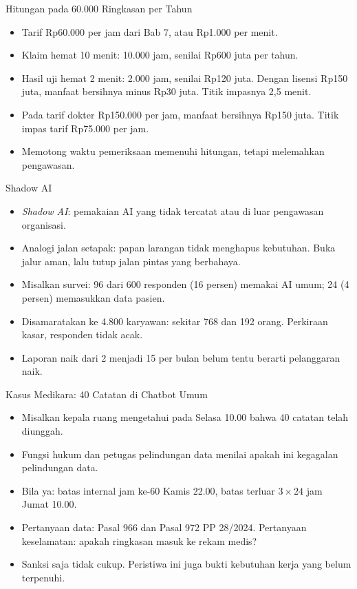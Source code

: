 \documentclass[aspectratio=169, table, 12pt]{beamer}
\begin{document}
\begin{frame}{{\Large Hitungan pada 60.000 Ringkasan per Tahun}}
  \vspace{6pt}
  \small
  \begin{itemize}
    \item Tarif Rp60.000 per jam dari Bab 7, atau Rp1.000 per menit.
    \item Klaim hemat 10 menit: 10.000 jam, senilai Rp600 juta per tahun.
    \item Hasil uji hemat 2 menit: 2.000 jam, senilai Rp120 juta. Dengan lisensi Rp150 juta,
          manfaat bersihnya minus Rp30 juta. Titik impasnya 2,5 menit.
    \item Pada tarif dokter Rp150.000 per jam, manfaat bersihnya Rp150 juta. Titik impas tarif
          Rp75.000 per jam.
    \item Memotong waktu pemeriksaan memenuhi hitungan, tetapi melemahkan pengawasan.
  \end{itemize}
\end{frame}

\begin{frame}{{\Large Shadow AI}}
  \vspace{6pt}
  \small
  \begin{itemize}
    \item \textit{Shadow AI}: pemakaian AI yang tidak tercatat atau di luar pengawasan organisasi.
    \item Analogi jalan setapak: papan larangan tidak menghapus kebutuhan. Buka jalur aman, lalu
          tutup jalan pintas yang berbahaya.
    \item Misalkan survei: 96 dari 600 responden (16 persen) memakai AI umum; 24 (4 persen)
          memasukkan data pasien.
    \item Disamaratakan ke 4.800 karyawan: sekitar 768 dan 192 orang. Perkiraan kasar, responden
          tidak acak.
    \item Laporan naik dari 2 menjadi 15 per bulan belum tentu berarti pelanggaran naik.
  \end{itemize}
\end{frame}

\begin{frame}{{\Large Kasus Medikara: 40 Catatan di Chatbot Umum}}
  \vspace{6pt}
  \small
  \begin{itemize}
    \item Misalkan kepala ruang mengetahui pada Selasa 10.00 bahwa 40 catatan telah diunggah.
    \item Fungsi hukum dan petugas pelindungan data menilai apakah ini kegagalan pelindungan data.
    \item Bila ya: batas internal jam ke-60 Kamis 22.00, batas terluar $3 \times 24$ jam Jumat
          10.00.
    \item Pertanyaan data: Pasal 966 dan Pasal 972 PP 28/2024. Pertanyaan keselamatan: apakah
          ringkasan masuk ke rekam medis?
    \item Sanksi saja tidak cukup. Peristiwa ini juga bukti kebutuhan kerja yang belum terpenuhi.
  \end{itemize}
\end{frame}
\end{document}
